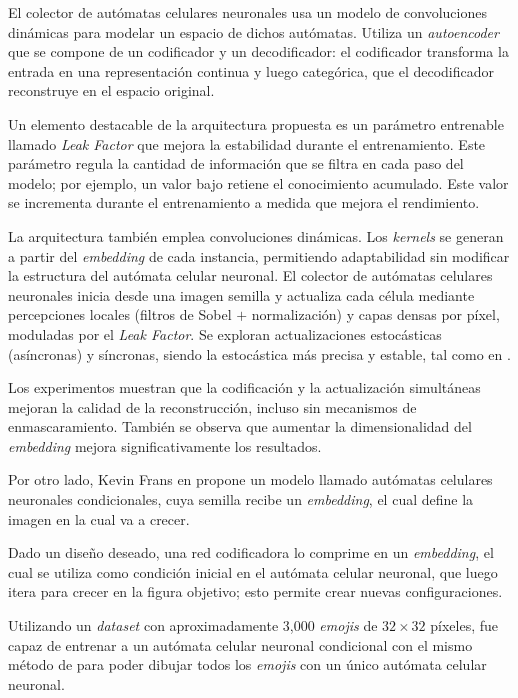 El colector de autómatas celulares neuronales usa un modelo de convoluciones dinámicas para modelar un espacio de dichos autómatas. Utiliza un \textit{autoencoder} que se compone de un codificador y un decodificador: el codificador transforma la entrada en una representación continua y luego categórica, que el decodificador reconstruye en el espacio original.

Un elemento destacable de la arquitectura propuesta es un parámetro entrenable llamado \textit{Leak Factor} que mejora la estabilidad durante el entrenamiento. Este parámetro regula la cantidad de información que se filtra en cada paso del modelo; por ejemplo, un valor bajo retiene el conocimiento acumulado. Este valor se incrementa durante el entrenamiento a medida que mejora el rendimiento.

La arquitectura también emplea convoluciones dinámicas. Los \textit{kernels} se generan a partir del \textit{embedding} de cada instancia, permitiendo adaptabilidad sin modificar la estructura del autómata celular neuronal. El colector de autómatas celulares neuronales inicia desde una imagen semilla y actualiza cada célula mediante percepciones locales (filtros de Sobel $+$ normalización) y capas densas por píxel, moduladas por el \textit{Leak Factor}. Se exploran actualizaciones estocásticas (asíncronas) y síncronas, siendo la estocástica más precisa y estable, tal como en \cite{niklasson2021_nca}.

Los experimentos muestran que la codificación y la actualización simultáneas mejoran la calidad de la reconstrucción, incluso sin mecanismos de enmascaramiento. También se observa que aumentar la dimensionalidad del \textit{embedding} mejora significativamente los resultados.

Por otro lado, Kevin Frans en \cite{frans2021_stampca} propone un modelo llamado autómatas celulares neuronales condicionales, cuya semilla recibe un \textit{embedding}, el cual define la imagen en la cual va a crecer. 

Dado un diseño deseado, una red codificadora lo comprime en un \textit{embedding}, el cual se utiliza como condición inicial en el autómata celular neuronal, que luego itera para crecer en la figura objetivo; esto permite crear nuevas configuraciones.

Utilizando un \textit{dataset} con aproximadamente 3,000 \textit{emojis} de $32 \times 32$ píxeles, fue capaz de entrenar a un autómata celular neuronal condicional con el mismo método de \cite{mordvintsev2020_nca} para poder dibujar todos los \textit{emojis} con un único autómata celular neuronal.

